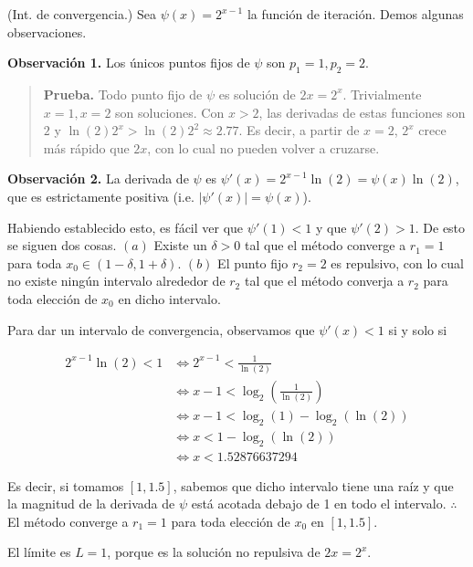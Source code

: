 \documentclass[12pt]{article}
\begin{document}
(Int. de convergencia.) Sea $\psi(x) = 2^{x-1}$ la función de iteración. Demos
algunas observaciones. 

\textbf{Observación 1.} Los únicos puntos fijos de $\psi$ son $p_1 = 1, p_2 = 2$.


\small
\begin{quote}

\textbf{Prueba.} Todo punto fijo de $\psi$ es solución de $2x = 2^x$.
Trivialmente $x = 1, x = 2$ son soluciones. Con $x > 2$, las derivadas de estas
funciones son $2$ y $\ln(2) 2^x > \ln(2) 2^2 \approx 2.77$. Es decir, a partir
de $x = 2$, $2^x$ crece más rápido que $2x$, con lo cual no pueden volver a
cruzarse. 

\end{quote}
\normalsize

\textbf{Observación 2.} La derivada de $\psi$ es $\psi'(x) = 2^{x-1} \ln(2) =
\psi(x) \ln (2)$, que es estrictamente positiva (i.e. $\left| \psi'(x) \right| =
\psi(x)$).

Habiendo establecido esto, es fácil ver que $\psi'(1) < 1$ y que $\psi'(2) > 1$.
De esto se siguen dos cosas. $(a)$ Existe un $\delta > 0$ tal que el método
converge a $r_1 = 1$ para toda $x_0 \in (1 - \delta, 1 + \delta)$. $(b)$ El
punto fijo $r_2 = 2$ es repulsivo, con lo cual no existe ningún intervalo
alrededor de $r_2$ tal que el método converja a $r_2$ para toda elección de
$x_0$ en dicho intervalo.

Para dar un intervalo de convergencia, observamos que $\psi'(x) < 1$ si y solo
si

\begin{align*}
    2^{x-1} \ln(2) < 1 
    &\iff 
    2^{x-1} < \frac{1}{\ln(2)}\\ 
    &\iff 
    x-1 <  \log_2 \left( \frac{1}{\ln(2)} \right)  \\ 
    &\iff 
    x -1 < \log_2(1) - \log_2 \left( \ln(2) \right)  \\ 
    &\iff 
    x < 1 - \log_2 \left( \ln (2) \right) \\ 
    &\iff 
    x < 1.52876637294
\end{align*}

Es decir, si tomamos $[1, 1.5]$, sabemos que dicho intervalo tiene una raíz y
que la magnitud de la derivada de $\psi$ está acotada debajo de 1 en todo el
intervalo. $\therefore $ El método converge a $r_1 = 1$ para toda elección de
$x_0$ en $[1, 1.5]$.

El límite es $L = 1$, porque es la solución no repulsiva de $2x = 2^x$.
\end{document}
